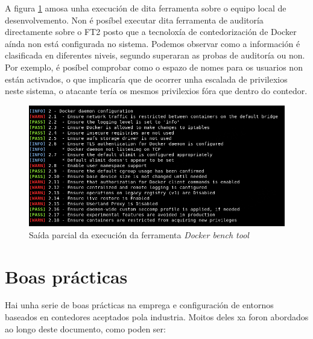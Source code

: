 A figura \ref{dockerBench} amosa unha execución de dita ferramenta sobre o equipo local de desenvolvemento. Non é posíbel executar dita ferramenta de auditoría directamente sobre o \gls{FT2} posto que a tecnoloxía de contedorización de Docker aínda non está configurada no sistema. Podemos observar como a información é clasificada en diferentes niveis, segundo superaran as probas de auditoría ou non. Por exemplo, é posíbel comprobar como o espazo de nomes para os usuarios non están activados, o que implicaría que de ocorrer unha escalada de privilexios neste sistema, o atacante tería os mesmos privilexios fóra que dentro do contedor.

\begin{figure}
\centerline{\includegraphics[width=15cm]{figuras/dockerBench.png}}
\caption{Saída parcial da execución da ferramenta \textit{Docker bench tool}}
\label{dockerBench}
\end{figure}


\section{Boas prácticas}

Hai unha serie de boas prácticas na emprega e configuración de entornos baseados en contedores aceptados pola industria. Moitos deles xa foron abordados ao longo deste documento, como poden ser:

